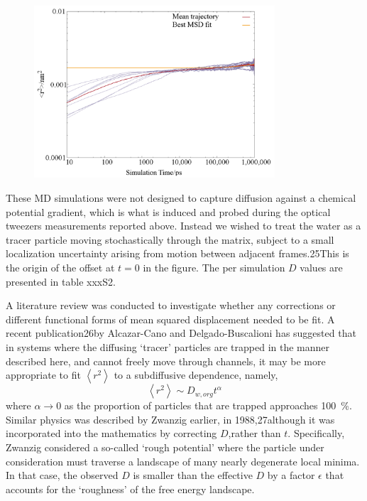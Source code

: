 \begin{figure}
    \centering
    \includegraphics[width=0.8\textwidth]{chapters/water_hopping/figures/Fig_S7.png}
    \label{fig:wat_s7}
\end{figure}

These MD simulations were not designed to capture diffusion against a chemical potential gradient, which is what is induced and probed during the optical tweezers measurements reported above. Instead we wished to treat the water as a tracer particle moving stochastically through the matrix, subject to a small localization uncertainty arising from motion between adjacent frames.25This is the origin of the offset at $t=0$ in the figure. The per simulation $D$ values are presented in table xxxS2. 

A literature review was conducted to investigate whether any corrections or different functional forms of mean squared displacement needed to be fit. A recent publication26by Alcazar-Cano and Delgado-Buscalioni has suggested that in systems where the diffusing ‘tracer’ particles are trapped in the manner described here, and cannot freely move through channels, it may be more appropriate to fit $\left\langle r^{2}\right\rangle$ to a subdiffusive dependence, namely, 
\begin{equation}
\left\langle r^{2}\right\rangle \sim D_{w, org} t^{\alpha}
\end{equation}
where $\alpha \rightarrow 0$ as the proportion of particles that are trapped approaches \SI{100}{\percent}. Similar physics was described by Zwanzig earlier, in 1988,27although it was incorporated into the mathematics by correcting $D$,rather than $t$. Specifically, Zwanzig considered a so-called `rough potential' where the particle under consideration must traverse a landscape of many nearly degenerate local minima. In that case, the observed $D$ is smaller than the effective $D$ by a factor $\epsilon$ that accounts for the `roughness' of the free energy landscape.

